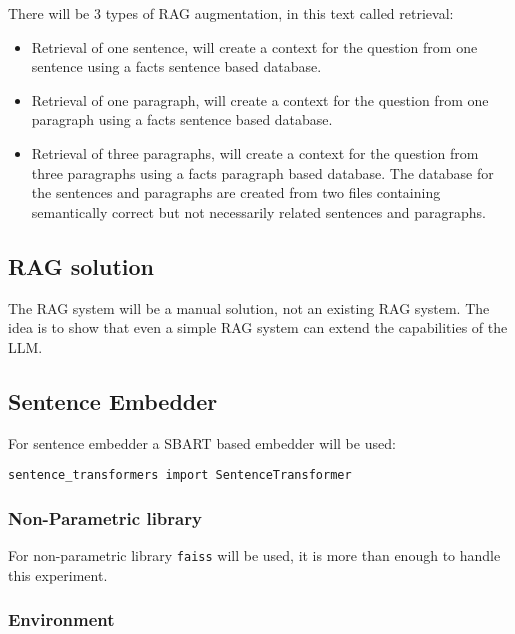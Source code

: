 \documentclass[11pt]{wseas}
\begin{document}
There will be 3 types of RAG augmentation, in this text called
retrieval:

\begin{itemize}
\tightlist
\item
  Retrieval of one sentence, will create a context for the question from
  one sentence using a facts sentence based database.
\item
  Retrieval of one paragraph, will create a context for the question
  from one paragraph using a facts sentence based database.
\item
  Retrieval of three paragraphs, will create a context for the question
  from three paragraphs using a facts paragraph based database. The
  database for the sentences and paragraphs are created from two files
  containing semantically correct but not necessarily related sentences
  and paragraphs.
\end{itemize}

\subsection{RAG solution}\label{rag-solution}

The RAG system will be a manual solution, not an existing RAG system.
The idea is to show that even a simple RAG system can extend the
capabilities of the LLM.

\subsection{Sentence Embedder}\label{sentence-embedder}

For sentence embedder a SBART based embedder will be used:

\begin{verbatim}
sentence_transformers import SentenceTransformer
\end{verbatim}

\subsubsection{Non-Parametric library}\label{non-parametric-library}

For non-parametric library \texttt{faiss} will be used, it is more than
enough to handle this experiment.

\subsubsection{Environment}\label{environment}
\end{document}
